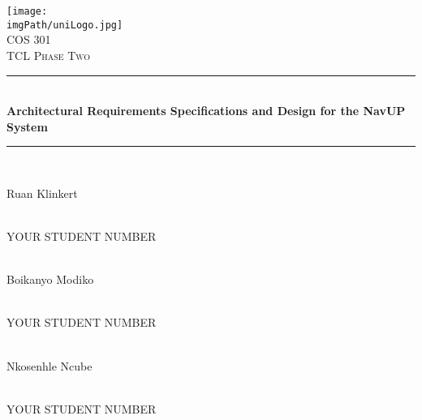 \begin{titlepage}
	
	\begin{center}
		\texttt{[image: \\imgPath/uniLogo.jpg]}\\[1cm]    
		\textsc{\LARGE COS 301}\\[0.3cm]
		\textsc{\LARGE TCL Phase Two}\\[0.3cm]
		\rule{\linewidth}{0.5mm} \\[1cm]
		{ \huge \bfseries Architectural Requirements Specifications and Design for the NavUP System}\\[0.5cm]
		\rule{\linewidth}{0.5mm} \\[1cm] 			
		
		\begin{minipage}{0.4\textwidth}
			\begin{flushleft} \large
				Ruan {Klinkert}\dotfill
			\end{flushleft}
		\end{minipage}
		\begin{minipage}{0.4\textwidth}
			\begin{flushright} \large
				\emph{} \\\dotfill
				YOUR STUDENT NUMBER
			\end{flushright}
		\end{minipage}
		
		
		\begin{minipage}{0.4\textwidth}
			\begin{flushleft} \large
				\emph{} \\
				Boikanyo {Modiko}\dotfill
			\end{flushleft}
		\end{minipage}
		\begin{minipage}{0.4\textwidth}
			\begin{flushright} \large
				\emph{} \\\dotfill
				YOUR STUDENT NUMBER
			\end{flushright}
		\end{minipage}
		
		
		\begin{minipage}{0.4\textwidth}
			\begin{flushleft} \large
				\emph{} \\
				Nkosenhle {Ncube}\dotfill
			\end{flushleft}
		\end{minipage}
		\begin{minipage}{0.4\textwidth}
			\begin{flushright} \large
				\emph{} \\\dotfill
				YOUR STUDENT NUMBER
			\end{flushright}
		\end{minipage}


\end{center}
\end{titlepage}
